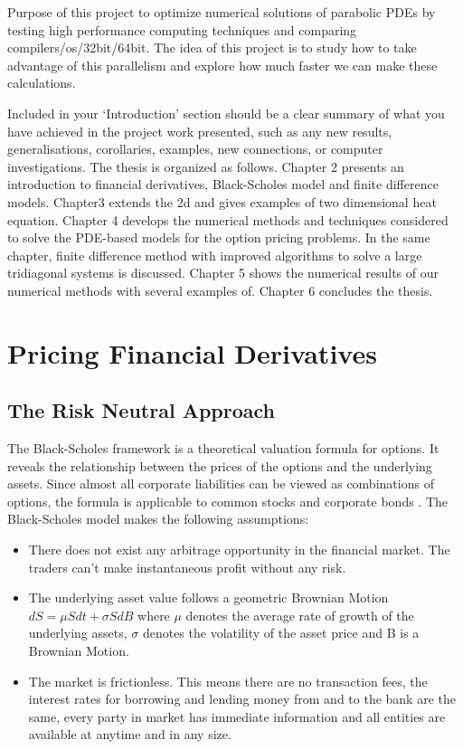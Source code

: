 \documentclass[12pt, oneside]{book}
\theoremstyle{plain}
\theoremstyle{definition}
\begin{document}
Purpose of this project to optimize numerical solutions of parabolic PDEs by testing high performance computing techniques and comparing compilers/os/32bit/64bit.
The idea of this project is to study how to take advantage of this parallelism and explore how much faster we can make these calculations.


Included in your ‘Introduction’ section should be a clear summary of  what  you  have  achieved  in  the  project  work  presented,  such  as  any  new  results, generalisations, corollaries, examples, new connections, or computer investigations.  The thesis is organized as follows.  Chapter 2 presents an introduction to financial derivatives, Black-Scholes model and finite difference models.  Chapter3 extends the 2d and gives examples of two dimensional heat equation.  Chapter 4 develops the numerical methods and techniques considered to solve the PDE-based models for the option pricing problems.  In the same chapter,  finite difference method with improved algorithms to solve a large tridiagonal systems is discussed.  Chapter 5 shows the numerical results of our numerical methods with several examples of.  Chapter 6 concludes the thesis.

\chapter{Pricing Financial Derivatives}\label{Pricing Financial Derivatives}
\section{The Risk Neutral Approach}
The Black-Scholes framework is a theoretical valuation formula for options. It reveals the relationship between the prices of the options and the underlying assets. Since almost all corporate liabilities can be viewed as combinations of options, the formula is applicable to common stocks and corporate bonds \cite{BS}. The Black-Scholes model makes the following assumptions:
\begin{itemize}
\item There does not exist any arbitrage opportunity in the financial market.  The traders can’t make instantaneous profit without any risk.
\item The underlying asset value follows a geometric Brownian Motion $dS = \mu S dt + \sigma S dB $ where $\mu$ denotes the average rate of growth of the underlying assets, $\sigma$ denotes the volatility of the asset price and B is a Brownian Motion.
\item The market is frictionless.  This means there are no transaction fees, the interest rates for borrowing and lending money from and to the bank are the same, every party  in  market  has  immediate  information  and  all  entities  are  available  at  anytime and in any size.
\end{itemize}
\end{document}
